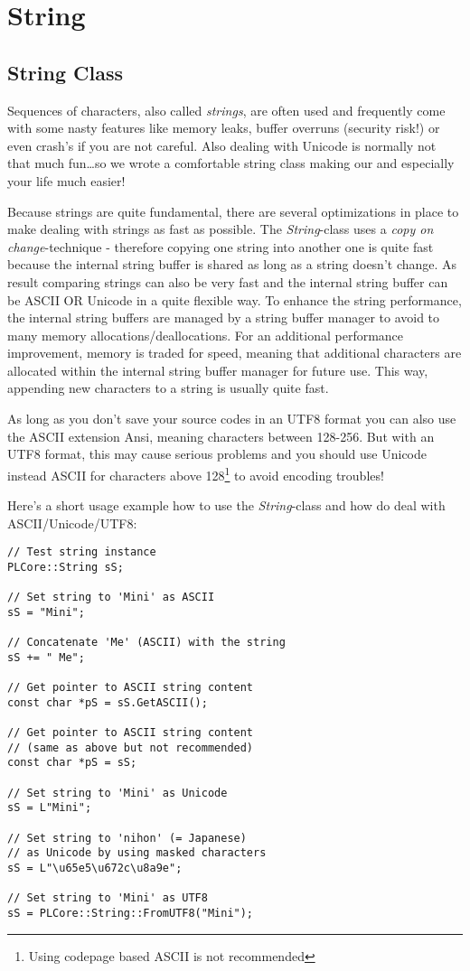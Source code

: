 \section{String}




\subsection{String Class}
Sequences of characters, also called \emph{strings}, are often used and frequently come with some nasty features like memory leaks, buffer overruns (security risk!) or even crash's if you are not careful. Also dealing with Unicode is normally not that much fun\ldots so we wrote a comfortable string class making our and especially your life much easier!

Because strings are quite fundamental, there are several optimizations in place to make dealing with strings as fast as possible. The \emph{String}-class uses a \emph{copy on change}-technique - therefore copying one string into another one is quite fast because the internal string buffer is shared as long as a string doesn't change. As result comparing strings can also be very fast and the internal string buffer can be ASCII OR Unicode in a quite flexible way. To enhance the string performance, the internal string buffers are managed by a string buffer manager to avoid to many memory allocations/deallocations. For an additional performance improvement, memory is traded for speed, meaning that additional characters are allocated within the internal string buffer manager for future use. This way, appending new characters to a string is usually quite fast.

As long as you don't save your source codes in an UTF8 format you can also use the ASCII extension Ansi, meaning characters between 128-256. But with an UTF8 format, this may cause serious problems and you should use Unicode instead ASCII for characters above 128\footnote{Using codepage based ASCII is not recommended} to avoid encoding troubles!

Here's a short usage example how to use the \emph{String}-class and how do deal with ASCII/Unicode/UTF8:

\begin{lstlisting}[caption=ASCII/Unicode/UTF8 string example]
// Test string instance
PLCore::String sS;

// Set string to 'Mini' as ASCII
sS = "Mini";

// Concatenate 'Me' (ASCII) with the string
sS += " Me";

// Get pointer to ASCII string content
const char *pS = sS.GetASCII();

// Get pointer to ASCII string content
// (same as above but not recommended)
const char *pS = sS;

// Set string to 'Mini' as Unicode
sS = L"Mini";

// Set string to 'nihon' (= Japanese)
// as Unicode by using masked characters
sS = L"\u65e5\u672c\u8a9e";

// Set string to 'Mini' as UTF8
sS = PLCore::String::FromUTF8("Mini");
\end{lstlisting}

